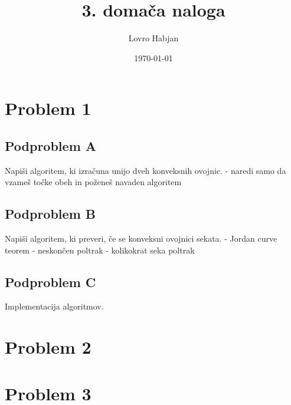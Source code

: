 \documentclass{article}
\title{3. domača naloga}
\author{Lovro Habjan}
\date{\today}
\begin{document}
\maketitle

\section{Problem 1}

\subsection{Podproblem A}

Napiši algoritem, ki izračuna unijo dveh konveksnih ovojnic. - naredi samo da vzameš točke obeh in poženeš navaden algoritem

\subsection{Podproblem B}

Napiši algoritem, ki preveri, če se konveksni ovojnici sekata. - Jordan curve teorem - neskončen poltrak - kolikokrat seka poltrak

\subsection{Podproblem C}

Implementacija algoritmov.

\section{Problem 2}

\section{Problem 3}
\end{document}
